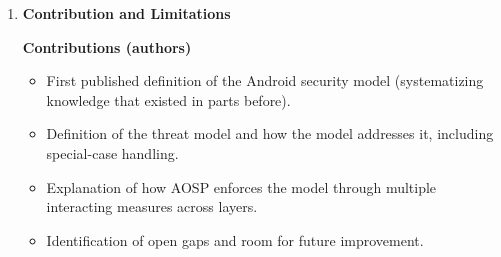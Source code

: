 \documentclass[11pt,a4paper]{article}
\newcommand{\entrypart}[1]{\textbf{\color{accent}#1}\par\vspace{2pt}}
\begin{document}
\begin{enumerate}
\begin{itemize}[leftmargin=*,itemsep=1pt,topsep=2pt]
\begin{itemize}[itemsep=0pt]
        \end{itemize}
        \item \textbf{Key changes by release (Tables 1 to 4, examples):}
        \begin{itemize}[itemsep=0pt]
            \item SELinux for all userspace (5.x), runtime permissions (6.x), seccomp filter for all apps (8.x), scoped external storage (10), TLS by default (9.0), MAC randomization by default (10).
            \item Treble: about 20 HALs moved out of system server, each in its own sandbox (8.x).
            \item CFI (9.0) and Shadow Call Stack (10) in the kernel.
        \end{itemize}
        \item \textbf{Hardware-backed protections:} Keymaster (TEE), Strongbox (tamper-resistant hardware; first on Pixel 3 with Titan M), Insider Attack Resistance, Protected Confirmation.
        \item \textbf{Integrity:} Verified Boot mandated since Android 7 (exemptions up to Android 8 for slow AES devices; none from 9.0); VBMeta digest in key attestation from Android 10 on some devices.
        \item \textbf{Updates:} 2018 Android Enterprise Recommended requirement of 90-day guaranteed security updates.
        \item \textbf{Future work named by authors:} declarative encryption for apps; signing or permission for dynamically loaded code; protection if OEM signing keys leak (e.g., firmware transparency logs); defenses against RAM and hardware attacks.
    \end{itemize}

    \item \entrypart{Contribution and Limitations}

    \textbf{Contributions (authors)}
    \begin{itemize}[leftmargin=*,itemsep=1pt,topsep=2pt]
        \item First published definition of the Android security model (systematizing knowledge that existed in parts before).
        \item Definition of the threat model and how the model addresses it, including special-case handling.
        \item Explanation of how AOSP enforces the model through multiple interacting measures across layers.
        \item Identification of open gaps and room for future improvement.
    \end{itemize}


\end{enumerate}
\end{document}
